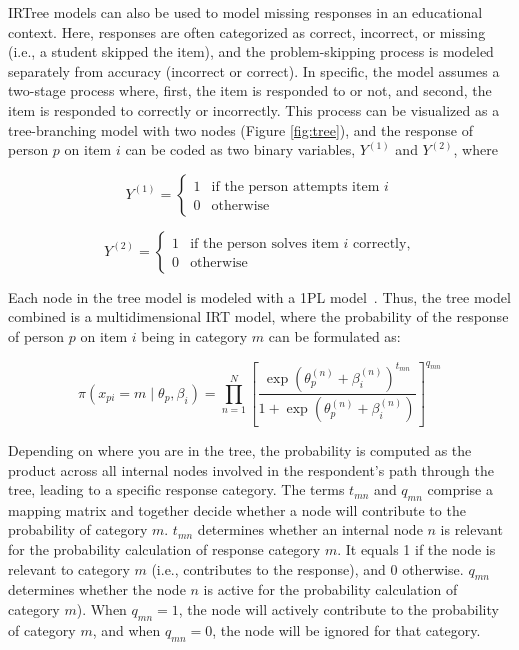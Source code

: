 \documentclass{edm_article}
\begin{document}
IRTree models can also be used to model missing responses in an educational context. Here, responses are often categorized as correct, incorrect, or missing (i.e., a student skipped the item), and the problem-skipping process is modeled separately from accuracy (incorrect or correct). In specific, the model assumes a two-stage process where, first, the item is responded to or not, and second, the item is responded to correctly or incorrectly. This process can be visualized as a tree-branching model with two nodes (Figure \ref{fig:tree}), and the response of person $p$ on item $i$ can be coded as two binary variables, $Y^{(1)}$ and $Y^{(2)}$, where 

\begin{equation}
Y^{(1)} =
\begin{cases} 
1 & \text{if the person attempts item } i \\
0 & \text{otherwise}
\end{cases}
\end{equation}

\begin{equation}
Y^{(2)} =
\begin{cases} 
1 & \text{if the person solves item } i \text{ correctly,} \\
0 & \text{otherwise}
\end{cases}
\label{eq:cases}
\end{equation}

Each node in the tree model is modeled with a 1PL model~\cite{rasch1993probabilistic}. Thus, the tree model combined is a multidimensional IRT model, where the probability of the response of person $p$ on item $i$ being in category $m$ can be formulated as: 

\begin{equation}
\pi(x_{pi} = m \mid \theta_p, \beta_i) = \prod_{n=1}^{N} \left[ \frac{\exp\left( \theta_p^{(n)} + \beta_i^{(n)} \right) ^{t_{mn}}}{1 + \exp\left( \theta_p^{(n)} + \beta_i^{(n)} \right)} \right]^{q_{mn}}
\label{eq:tree}
\end{equation}

\noindent Depending on where you are in the tree, the probability is computed as the product across all internal nodes involved in the respondent's path through the tree, leading to a specific response category. The terms $t_{mn}$ and $q_{mn}$ comprise a mapping matrix and together decide whether a node will contribute to the probability of category $m$. $t_{mn}$ determines whether an internal node $n$ is relevant for the probability calculation of response category $m$. It equals 1 if the node is relevant to category $m$ (i.e., contributes to the response), and 0 otherwise.
$q_{mn}$ determines whether the node $n$ is active for the probability calculation of category $m$). When $q_{mn} = 1$, the node will actively contribute to the probability of category $m$, and when $q_{mn} = 0$, the node will be ignored for that category.
\end{document}

